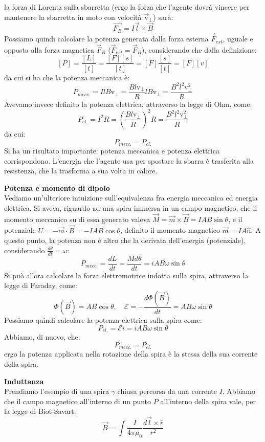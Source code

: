 \documentclass[a4paper,12pt]{article}
\begin{document}
la forza di Lorentz sulla sbarretta (ergo la forza che l'agente dovrà vincere per mantenere la sbarretta in moto con velocità $\vec{\mathrm{v}}_\perp$) sarà:
$$ \vec{F_B} = I \vec{l} \times \vec{B} $$
Possiamo quindi calcolare la potenza generata dalla forza esterna $\vec{F}_{est}$, uguale e opposta alla forza magnetica $\vec{F}_B$ ($\vec{F}_{est} = \vec{F}_B$), considerando che dalla definizione:
$$ [P] = \frac{[L]}{[t]} = \frac{[F][s]}{[t]} = [F] \frac{[s]}{[t]} = [F][v] $$
da cui si ha che la potenza meccanica è:
$$ P_{mecc.} = IlB \mathrm{v}_\perp = \frac{Bl\mathrm{v}_\perp}{R} lB \mathrm{v}_\perp = \frac{B^2l^2\mathrm{v}_\perp^2}{R} $$
Avevamo invece definito la potenza elettrica, attraverso la legge di Ohm, come:
$$ P_{el.} = I^2R = \left(\frac{Bl\mathrm{v}_\perp}{R}\right)^2 R = \frac{B^2l^2\mathrm{v}_\perp^2}{R} $$
da cui:
$$ P_{mecc.} = P_{el.} $$
Si ha un risultato importante: potenza meccanica e potenza elettrica corrispondono. L'energia che l'agente usa per spostare la sbarra è trasferita alla resistenza, che la trasforma a sua volta in calore.
\par\smallskip
\textbf{Potenza e momento di dipolo} \\
Vediamo un'ulteriore intuizione sull'equivalenza fra energia meccanica ed energia elettrica. Si aveva, riguardo ad una spira immersa in un campo magnetico,
che il momento meccanico su di essa generato valeva $\vec{M} = \vec{m} \times \vec{B} =  IAB\sin{\theta}$, e il potenziale $U = -\vec{m} \cdot \vec{B} = -IAB\cos{\theta}$, definito il momento magnetico $\vec{m} = IA\hat{n}$.
A questo punto, la potenza non è altro che la derivata dell'energia (potenziale), considerando $\frac{d\theta}{dt} = \omega$:
$$ P_{mecc.} = \frac{dL}{dt} = \frac{Md\theta}{dt} = iAB\omega\sin{\theta}$$ 
Si può allora calcolare la forza elettromotrice indotta sulla spira, attraverso la legge di Faraday, come:
$$ \Phi(\vec{B}) = AB\cos{\theta}, \quad \mathcal{E} = -\frac{d\Phi(\vec{B})}{dt} = AB\omega\sin{\theta} $$
Possiamo quindi calcolare la potenza elettrica sulla spira come:
$$ P_{el.} = \mathcal{E} i = iAB\omega\sin{\theta} $$
Abbiamo, di nuovo, che:
$$ P_{mecc.} = P_{el.} $$
ergo la potenza applicata nella rotazione della spira è la stessa della sua corrente della spira.
\par\smallskip
\textbf{Induttanza} \\
Prendiamo l'esempio di una spira $\gamma$ chiusa percorsa da una corrente $I$. Abbiamo che il campo magnetico all'interno di un punto $P$ all'interno della spira vale, per la legge di Biot-Savart:
$$ \vec{B} = \int \frac{I}{4\pi\mu_0} \frac{d\vec{l} \times \hat{r}}{r^2} $$
\end{document}
